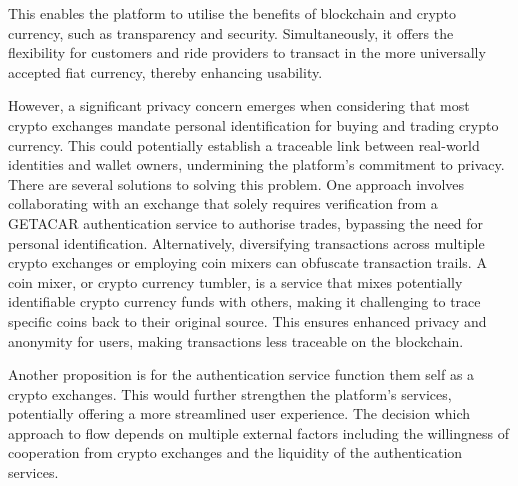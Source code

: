 This enables the platform to utilise the benefits of blockchain and crypto currency, such as transparency and security. Simultaneously, it offers the flexibility for customers and ride providers to transact in the more universally accepted fiat currency, thereby enhancing usability.

However, a significant privacy concern emerges when considering that most crypto exchanges mandate personal identification for buying and trading crypto currency. This could potentially establish a traceable link between real-world identities and wallet owners, undermining the platform's commitment to privacy. There are several solutions to solving this problem. One approach involves collaborating with an exchange that solely requires verification from a GETACAR authentication service to authorise trades, bypassing the need for personal identification. Alternatively, diversifying transactions across multiple crypto exchanges or employing coin mixers can obfuscate transaction trails. A coin mixer, or crypto currency tumbler, is a service that mixes potentially identifiable crypto currency funds with others, making it challenging to trace specific coins back to their original source. This ensures enhanced privacy and anonymity for users, making transactions less traceable on the blockchain.

Another proposition is for the authentication service function them self as a crypto exchanges. This would further strengthen the platform's services, potentially offering a more streamlined user experience. The decision which approach to flow  depends on multiple external factors including the willingness of cooperation from crypto exchanges and the liquidity of the authentication services.
 
